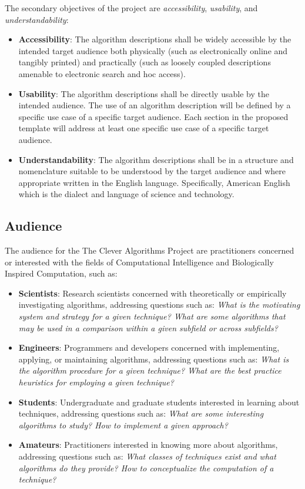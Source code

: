 \documentclass[a4paper, 11pt]{article}
\begin{document}
The secondary objectives of the project are \emph{accessibility}, \emph{usability}, and \emph{understandability}:

\begin{itemize}
	\item \textbf{Accessibility}: The algorithm descriptions shall be widely accessible by the intended target audience both physically (such as electronically online and tangibly printed) and practically (such as loosely coupled descriptions amenable to electronic search and hoc access).
	\item \textbf{Usability}: The algorithm descriptions shall be directly usable by the intended audience. The use of an algorithm description will be defined by a specific use case of a specific target audience. Each section in the proposed template will address at least one specific use case of a specific target audience.
	\item \textbf{Understandability}: The algorithm descriptions shall be in a structure and nomenclature suitable to be understood by the target audience and where appropriate written in the English language. Specifically, American English which is the dialect and language of science and technology.
\end{itemize}

\subsection{Audience}
The audience for the The Clever Algorithms Project are practitioners concerned or interested with the fields of Computational Intelligence and Biologically Inspired Computation, such as:

\begin{itemize}
	\item \textbf{Scientists}: Research scientists concerned with theoretically or empirically investigating algorithms, addressing questions such as: \emph{What is the motivating system and strategy for a given technique? What are some algorithms that may be used in a comparison within a given subfield or across subfields?}
	\item \textbf{Engineers}: Programmers and developers concerned with implementing, applying, or maintaining algorithms, addressing questions such as: \emph{What is the algorithm procedure for a given technique? What are the best practice heuristics for employing a given technique?}
	\item \textbf{Students}: Undergraduate and graduate students interested in learning about techniques, addressing questions such as: \emph{What are some interesting algorithms to study? How to implement a given approach?}
	\item \textbf{Amateurs}: Practitioners interested in knowing more about algorithms, addressing questions such as: \emph{What classes of techniques exist and what algorithms do they provide? How to conceptualize the computation of a technique?}
\end{itemize}
\end{document}

